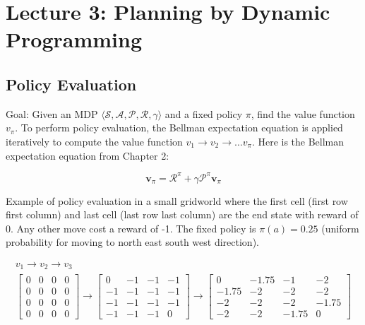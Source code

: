 \section{Lecture 3: Planning by Dynamic Programming}

\subsection{Policy Evaluation}

Goal: Given an MDP $\langle \mathcal{S}, \mathcal{A}, \mathcal{P}, \mathcal{R},
    \gamma \rangle$ and a fixed policy $\pi$, find the value function $v_\pi$. To
perform policy evaluation, the Bellman expectation equation is applied
iteratively to compute the value function $v_1 \to v_2 \to \ldots v_\pi$. Here
is the Bellman expectation equation from Chapter 2:

\[
    \mathbf{v}_{\pi} = \mathcal{R}^{\pi} + \gamma \mathcal{P}^{\pi} \mathbf{v}_{\pi}
\]

\noindent Example of policy evaluation in a small gridworld where the first cell (first
row first column) and last cell (last row last column) are the end state with
reward of 0. Any other move cost a reward of -1. The fixed policy is $\pi(a) =
    0.25$ (uniform probability for moving to north east south west direction).

\begin{gather*}
    v_1 \to v_2 \to v_3 \\
    \begin{bmatrix}
        0 & 0 & 0 & 0 \\
        0 & 0 & 0 & 0 \\
        0 & 0 & 0 & 0 \\
        0 & 0 & 0 & 0
    \end{bmatrix}         \to
    \begin{bmatrix}
        0  & -1 & -1 & -1 \\
        -1 & -1 & -1 & -1 \\
        -1 & -1 & -1 & -1 \\
        -1 & -1 & -1 & 0
    \end{bmatrix}     \to
    \begin{bmatrix}
        0     & -1.75 & -1    & -2    \\
        -1.75 & -2    & -2    & -2    \\
        -2    & -2    & -2    & -1.75 \\
        -2    & -2    & -1.75 & 0
    \end{bmatrix}
\end{gather*}

